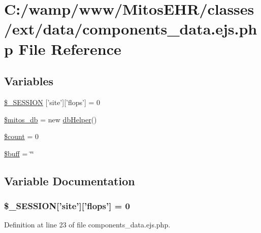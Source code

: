 \hypertarget{components__data_8ejs_8php}{\section{\-C\-:/wamp/www/\-Mitos\-E\-H\-R/classes/ext/data/components\-\_\-data.ejs.\-php \-File \-Reference}
\label{components__data_8ejs_8php}
}
\subsection*{\-Variables}
\begin{DoxyCompactItemize}
\item 
\hyperlink{components__data_8ejs_8php_a99fda8552a3e58235643b79f5af3ded8}{\$\-\_\-\-S\-E\-S\-S\-I\-O\-N} \mbox{[}'site'\mbox{]}\mbox{[}'flops'\mbox{]} = 0
\item 
\hyperlink{components__data_8ejs_8php_ab5d961f93efe4e2e8d8374f01dd6c65a}{\$mitos\-\_\-db} = new \hyperlink{classdb_helper}{db\-Helper}()
\item 
\hyperlink{components__data_8ejs_8php_af789423037bbc89dc7c850e761177570}{\$count} = 0
\item 
\hyperlink{components__data_8ejs_8php_aee88b745b9e14ca8b4227da600cea0b8}{\$buff} = \char`\"{}\char`\"{}
\end{DoxyCompactItemize}


\subsection{\-Variable \-Documentation}
\hypertarget{components__data_8ejs_8php_a99fda8552a3e58235643b79f5af3ded8}{
\subsubsection[{\$\-\_\-\-S\-E\-S\-S\-I\-O\-N}]{\setlength{\rightskip}{0pt plus 5cm}\$\-\_\-\-S\-E\-S\-S\-I\-O\-N\mbox{[}'site'\mbox{]}\mbox{[}'flops'\mbox{]} = 0}}\label{components__data_8ejs_8php_a99fda8552a3e58235643b79f5af3ded8}


\-Definition at line 23 of file components\-\_\-data.\-ejs.\-php.

